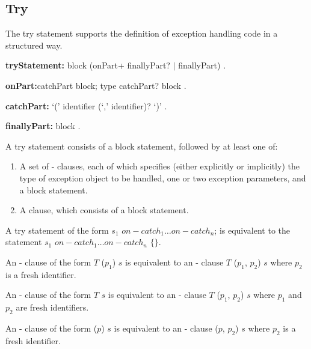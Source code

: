 \documentclass{article}
\newcommand{\code}[1]{{\sf #1}}
\begin{document}
\subsection{ Try}

\LMHash{}
The try statement supports the definition of exception handling code in a structured way.

\begin{grammar}
{\bf tryStatement:}
      \TRY{} block (onPart+ finallyPart? $|$ finallyPart)
    .

 {\bf onPart:}catchPart block;
    \ON{} type catchPart? block
   .

{\bf catchPart:}
      \CATCH{} `(' identifier (`,' identifier)? `)'
    .

{\bf finallyPart:}
      \FINALLY{} block
    .
 \end{grammar}

\LMHash{}
A try statement consists of a block statement, followed by at least one of:
\begin{enumerate}
\item
A set of \ON{}-\CATCH{} clauses, each of which specifies (either explicitly or implicitly) the type of exception object to be handled, one or two exception parameters, and a block statement.
\item
A \FINALLY{} clause, which consists of a block statement.
\end{enumerate}


\LMHash{}
A try statement of the form \code{\TRY{} $s_1$ $on-catch_1 \ldots on-catch_n$;} is equivalent to the statement \code{\TRY{} $s_1$ $on-catch_1 \ldots on-catch_n$ \FINALLY{} $\{\}$}.

\LMHash{}
An \ON{}-\CATCH{} clause of the form  \code{\ON{} $T$ \CATCH{} ($p_1$) $s$} is equivalent to an \ON{}-\CATCH{} clause  \code{\ON{} $T$ \CATCH{} ($p_1$, $p_2$) $s$} where $p_2$ is a fresh identifier.

\LMHash{}
An \ON{}-\CATCH{} clause of the form  \code{\ON{} $T$ $s$} is equivalent to an \ON{}-\CATCH{} clause  \code{\ON{} $T$ \CATCH{} ($p_1$, $p_2$) $s$} where $p_1$ and $p_2$ are fresh identifiers.

\LMHash{}
An \ON{}-\CATCH{} clause of the form  \code{\CATCH{} ($p$) $s$} is equivalent to an \ON{}-\CATCH{} clause \code{\ON{} \DYNAMIC{} \CATCH{} ($p$, $p_2$) $s$} where $p_2$ is a fresh identifier.
\end{document}
